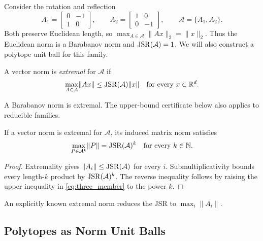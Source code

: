 \begin{example}
    \label{ex:barabanovExtremalNorm}
    Consider the rotation and reflection
    \[
        A_1=\begin{bmatrix}0&-1\\1&0\end{bmatrix},\qquad
        A_2=\begin{bmatrix}1&0\\0&-1\end{bmatrix},\qquad
        \mathcal{A}=\{A_1,A_2\}.
    \]
    Both preserve Euclidean length, so $\max_{A\in\mathcal{A}}\lVert Ax\rVert_2=\lVert x\rVert_2$.
    Thus the Euclidean norm is a Barabanov norm and $\operatorname{JSR}(\mathcal{A})=1$.
    We will also construct a polytope unit ball for this family.
\end{example}

\begin{definition}\citep{Protasov1996JSRInvariantSets}
    \label{def:extremalNorm}
    A vector norm is \emph{extremal} for $\mathcal{A}$ if
    \[
        \max_{A\in\mathcal{A}}\lVert Ax\rVert
        \leq\operatorname{JSR}(\mathcal{A})\lVert x\rVert
        \quad\text{for every }x\in\mathbb{R}^d.
    \]
\end{definition}

A Barabanov norm is extremal.
The upper-bound certificate below also applies to reducible families.

\begin{theorem}
    \label{thm:extremalNormProductGrowth}
    If a vector norm is extremal for $\mathcal{A}$, its induced matrix norm satisfies
    \[
        \max_{P\in\mathcal{A}^k}\lVert P\rVert=\operatorname{JSR}(\mathcal{A})^k
        \quad\text{for every }k\in\mathbb{N}.
    \]
\end{theorem}

\begin{proof}
    Extremality gives $\lVert A_i\rVert\leq\operatorname{JSR}(\mathcal{A})$ for every $i$.
    Submultiplicativity bounds every length-$k$ product by $\operatorname{JSR}(\mathcal{A})^k$.
    The reverse inequality follows by raising the upper inequality in \eqref{eq:three_member} to the power $k$.
\end{proof}

\begin{remark}
    \label{rem:extremalNormExactComputation}
    An explicitly known extremal norm reduces the JSR to $\max_i\lVert A_i\rVert$.
\end{remark}

\subsection{Polytopes as Norm Unit Balls}

